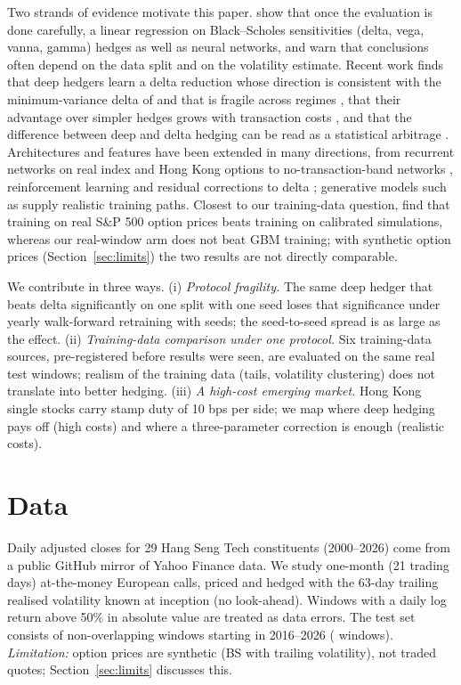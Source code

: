 \documentclass[11pt]{article}
\begin{document}
Two strands of evidence motivate this paper. \citet{ruf2022hedging} show that once the evaluation
is done carefully, a linear regression on Black--Scholes sensitivities (delta, vega, vanna, gamma)
hedges as well as neural networks, and
\citet{ruf2020review} warn that conclusions often depend on the data split and on the volatility estimate.
Recent work finds that deep hedgers learn a delta reduction whose direction is consistent with the
minimum-variance delta of \citet{hull2017optimal} and that is fragile across regimes
\citep{zernikov2026learn}, that their advantage over simpler hedges grows with transaction costs
\citep{francois2025ivs,bracha2025drl}, and that the difference between deep and delta hedging can be
read as a statistical arbitrage \citep{francois2024statarb}. Architectures and features have been
extended in many directions, from recurrent networks on real index and Hong Kong options
\citep{zhang2021option} to no-transaction-band networks \citep{imaki2021ntb}, reinforcement learning
\citep{cao2021deep} and residual corrections to delta \citep{qiao2024residual}; generative models such
as \citet{wiese2020quant} supply realistic training paths. Closest to our training-data question,
\citet{mikkila2023empirical} find that training on real S\&P 500 option prices beats training on
calibrated simulations, whereas our real-window arm does not beat GBM training; with synthetic option
prices (Section~\ref{sec:limits}) the two results are not directly comparable.

We contribute in three ways.
(i) \emph{Protocol fragility.} The same deep hedger that beats delta significantly on one split with
one seed loses that significance under yearly walk-forward retraining with \NSeeds{} seeds; the
seed-to-seed spread is as large as the effect.
(ii) \emph{Training-data comparison under one protocol.} Six training-data sources, pre-registered before
results were seen, are evaluated on the same \NTest{} real test windows; realism of the training data
(tails, volatility clustering) does not translate into better hedging.
(iii) \emph{A high-cost emerging market.} Hong Kong single stocks carry stamp duty of 10 bps per side;
we map where deep hedging pays off (high costs) and where a three-parameter correction is enough
(realistic costs).

\section{Data}
Daily adjusted closes for 29 Hang Seng Tech constituents (2000--2026) come from a public GitHub
mirror of Yahoo Finance data. We study one-month (21 trading days) at-the-money European calls,
priced and hedged with the 63-day trailing realised volatility known at inception (no look-ahead).
Windows with a daily log return above 50\% in absolute value are treated as data errors.
The test set consists of non-overlapping windows starting in 2016--2026 (\NTest{} windows).
\emph{Limitation:} option prices are synthetic (BS with trailing volatility), not traded quotes;
Section~\ref{sec:limits} discusses this.
\end{document}
